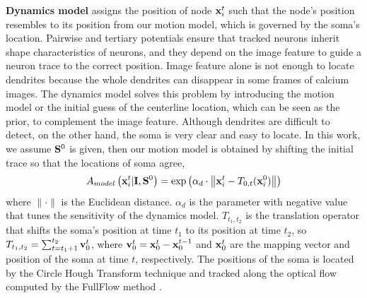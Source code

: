 \documentclass{article}
\begin{document}
{\bf Dynamics model} assigns the position of node ${\bf x}_i^t$ such that the node's position resembles to its position from our motion model, which is governed by the soma's location. Pairwise and tertiary potentials ensure that tracked neurons inherit shape characteristics of neurons, and they depend on the image feature to guide a neuron trace to the correct position. Image feature alone is not enough to locate dendrites because the whole dendrites can disappear in some frames of calcium images. The dynamics model solves this problem by introducing the motion model or the initial guess of the centerline location, which can be seen as the prior, to complement the image feature. Although dendrites are difficult to detect, on the other hand, the soma is very clear and easy to locate. In this work, we assume ${\bf S}^0$ is given, then our motion model is obtained by shifting the initial trace so that the locations of soma agree,
\begin{equation} \label{eq:dynamic}
A_{model}\left({\bf x}_i^t | {\bf I}, {\bf S}^0\right) = \exp \left( \alpha_d \cdot \left\| {\bf x}_i^t - T_{0,t}({\bf x}_i^0) \right\| \right)
\end{equation}
where $\|\cdot\|$ is the Euclidean distance. $\alpha_d$ is the parameter with negative value that tunes the sensitivity of the dynamics model. $T_{t_1,t_2}$ is the translation operator that shifts the soma's position at time $t_1$ to its position at time $t_2$, so $T_{t_1,t_2} = \sum_{t=t_1+1}^{t_2} {\bf v}_0^t$, where ${\bf v}_0^t = {\bf x}_0^t - {\bf x}_0^{t-1}$ and ${\bf x}_0^t$ are the mapping vector and position of the soma at time $t$, respectively. The positions of the soma is located by the Circle Hough Transform technique \cite{Duda1972, Atherton1999} and tracked along the optical flow computed by the FullFlow method \cite{Chen2016}.
\end{document}
